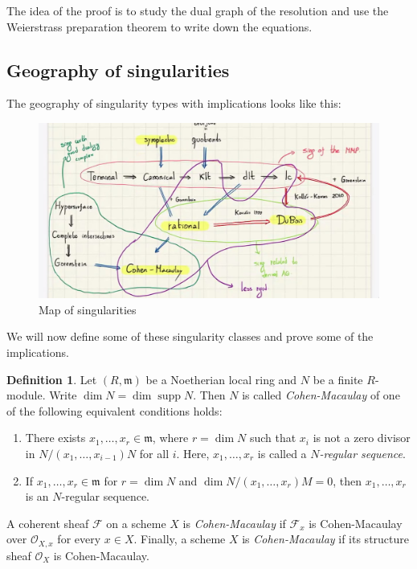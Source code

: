\documentclass[leqno, openany]{memoir}
\theoremstyle{definition}
\newtheorem{defn}[thm]{Definition}
\theoremstyle{remark}
\theoremstyle{plain}
\theoremstyle{definition}
\theoremstyle{remark}
\newcommand{\mc}[1]{\mathcal{#1}}
\newcommand{\mf}[1]{\mathfrak{#1}}
\DeclareMathOperator{\supp}{supp}
\begin{document}
The idea of the proof is to study the dual graph of the resolution and use the Weierstrass preparation theorem to write down the equations.

\subsection{Geography of singularities}%
\label{sub:geography_of_singularities}

The geography of singularity types with implications looks like this:
\begin{figure}[H]
    \centering
    \includegraphics[width=0.8\linewidth]{sing}
    \caption{Map of singularities}%
    \label{fig:sing}
\end{figure}

We will now define some of these singularity classes and prove some of the implications.

\begin{defn}
    Let $(R, \mf{m})$ be a Noetherian local ring and $N$ be a finite $R$-module. Write $\dim N = \dim \supp N$. Then $N$ is called \textit{Cohen-Macaulay} of one of the following equivalent conditions holds:
    \begin{enumerate}
        \item There exists $x_1, \ldots, x_r \in \mf{m}$, where $r = \dim N$ such that $x_i$ is not a zero divisor in $N/(x_1, \ldots, x_{i-1})N$ for all $i$. Here, $x_1, \ldots, x_r$ is called a \textit{$N$-regular sequence}.
        \item If $x_1, \ldots, x_r \in \mf{m}$ for $r = \dim N$ and $\dim N/(x_1, \ldots, x_r)M = 0$, then $x_1, \ldots, x_r$ is an $N$-regular sequence.
    \end{enumerate}
    A coherent sheaf $\mc{F}$ on a scheme $X$ is \textit{Cohen-Macaulay} if $\mc{F}_x$ is Cohen-Macaulay over $\mc{O}_{X,x}$ for every $x \in X$. Finally, a scheme $X$ is \textit{Cohen-Macaulay} if its structure sheaf $\mc{O}_X$ is Cohen-Macaulay.
\end{defn}
\end{document}
